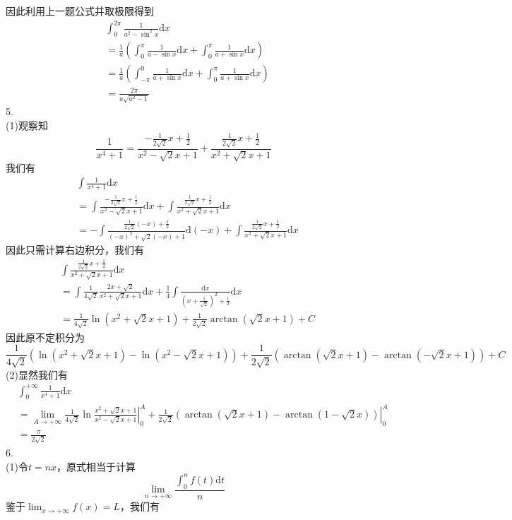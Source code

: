 \documentclass[utf8]{ctexart}
\begin{document}
因此利用上一题公式并取极限得到
\begin{align*}
	&\int_{0}^{2\pi}\frac{1}{a^2-\sin^2x}\mathrm{d}x\\
	&=\frac{1}{a}(\int_{0}^{\pi}\frac{1}{a-\sin x}\mathrm{d}x+\int_{0}^{\pi}\frac{1}{a+\sin x}\mathrm{d}x)\\
	&=\frac{1}{a}(\int_{-\pi}^{0}\frac{1}{a+\sin x}\mathrm{d}x+\int_{0}^{\pi}\frac{1}{a+\sin x}\mathrm{d}x)\\
	&=\frac{2\pi}{a\sqrt{a^2-1}}
\end{align*}
5.\\
(1)观察知
\[\frac{1}{x^4+1}=\frac{-\frac{1}{2\sqrt{2}}x+\frac{1}{2}}{x^2-\sqrt{2}x+1}+\frac{\frac{1}{2\sqrt{2}}x+\frac{1}{2}}{x^2+\sqrt{2}x+1}\]
我们有
\begin{align*}
	&\int\frac{1}{x^4+1}\mathrm{d}x\\
	&=\int\frac{-\frac{1}{2\sqrt{2}}x+\frac{1}{2}}{x^2-\sqrt{2}x+1}\mathrm{d}x+\int\frac{\frac{1}{2\sqrt{2}}x+\frac{1}{2}}{x^2+\sqrt{2}x+1}\mathrm{d}x\\
	&=-\int\frac{\frac{1}{2\sqrt{2}}(-x)+\frac{1}{2}}{(-x)^2+\sqrt{2}(-x)+1}\mathrm{d}(-x)+\int\frac{\frac{1}{2\sqrt{2}}x+\frac{1}{2}}{x^2+\sqrt{2}x+1}\mathrm{d}x
\end{align*}
因此只需计算右边积分，我们有
\begin{align*}
	&\int\frac{\frac{1}{2\sqrt{2}}x+\frac{1}{2}}{x^2+\sqrt{2}x+1}\mathrm{d}x\\
	&=\int\frac{1}{4\sqrt{2}}\frac{2x+\sqrt{2}}{x^2+\sqrt{2}x+1}\mathrm{d}x+\frac{1}{4}\int\frac{\mathrm{d}x}{(x+\frac{1}{\sqrt{2}})^2+\frac{1}{2}}\mathrm{d}x\\
	&=\frac{1}{4\sqrt{2}}\ln(x^2+\sqrt{2}x+1)+\frac{1}{2\sqrt{2}}\arctan(\sqrt{2}x+1)+C
\end{align*}
因此原不定积分为
\[\frac{1}{4\sqrt{2}}(\ln(x^2+\sqrt{2}x+1)-\ln(x^2-\sqrt{2}x+1))+\frac{1}{2\sqrt{2}}(\arctan(\sqrt{2}x+1)-\arctan(-\sqrt{2}x+1))+C\]
(2)显然我们有
\begin{align*}
	&\int_{0}^{+\infty}\frac{1}{x^4+1}\mathrm{d}x\\
	&=\lim_{A\rightarrow+\infty}\left.\frac{1}{4\sqrt{2}}\ln\frac{x^2+\sqrt{2}x+1}{x^2-\sqrt{2}x+1}\right|_0^{A}+\left.\frac{1}{2\sqrt{2}}(\arctan(\sqrt{2}x+1)-\arctan(1-\sqrt{2}x))\right|_0^A\\
	&=\frac{\pi}{2\sqrt{2}}
\end{align*}
6.\\
(1)令$t=nx$，原式相当于计算
\[\lim_{n\rightarrow+\infty}\frac{\int_{0}^{n}f(t)\mathrm{d}t}{n}\]
鉴于$\lim_{x\rightarrow+\infty}f(x)=L$，我们有
\end{document}
